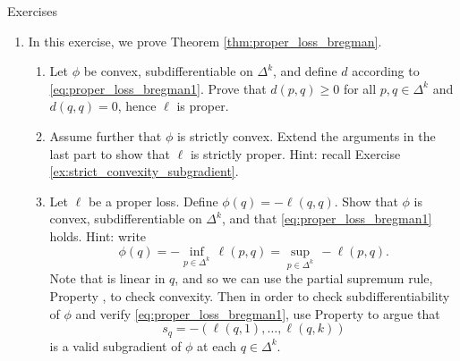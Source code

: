 \begin{xcb}{Exercises}
\begin{enumerate}[label=\thechapter.\arabic*]


\item \label{ex:proper_loss_bregman}
  In this exercise, we prove Theorem \ref{thm:proper_loss_bregman}. 

\begin{enumerate}[label=\alph*.]
\item Let $\phi$ be convex, subdifferentiable on $\Delta^k$, and define $d$
  according to \eqref{eq:proper_loss_bregman1}. Prove that $d(p,q) \geq 0$ for
  all $p,q \in \Delta^k$ and $d(q,q) = 0$, hence $\ell$ is proper. 

\item Assume further that $\phi$ is strictly convex. Extend the arguments in the 
  last part to show that $\ell$ is strictly proper. Hint: recall Exercise
  \ref{ex:strict_convexity_subgradient}. 

\item Let $\ell$ be a proper loss. Define $\phi(q) = -\ell(q,q)$. Show that
  $\phi$ is convex, subdifferentiable on $\Delta^k$, and that
  \eqref{eq:proper_loss_bregman1} holds. Hint: write 
  \[
  \phi(q) = -\inf_{p \in \Delta^k} \, \ell(p,q) = \sup_{p \in \Delta^k} \,
  -\ell(p,q).  
  \]
  Note that  is linear in
  $q$, and so we can use the partial supremum rule, Property
  , to check convexity. Then in order to check  
  subdifferentiability of $\phi$ and verify \eqref{eq:proper_loss_bregman1},
  use Property  to argue that 
  \[
  s_q = -(\ell(q,1),\dots,\ell(q,k))
  \]
  is a valid subgradient of $\phi$ at each $q \in \Delta^k$. 


\end{enumerate}
\end{enumerate}
\end{xcb}
